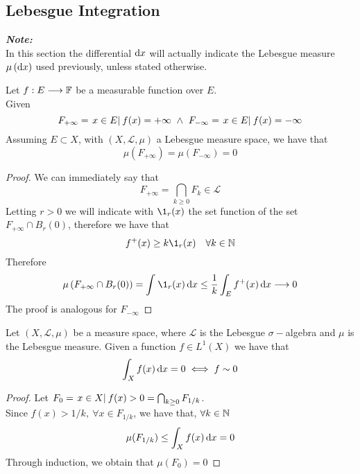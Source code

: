 \documentclass[../complete.tex]{subfiles}
\begin{document}
\subsection{Lebesgue Integration}
\textit{\textbf{Note:}}\\
In this section the differential $\operatorname{d\!} x$ will actually indicate the Lebesgue measure $\mu\left( \operatorname{d\!} x \right)$ used previously, unless stated otherwise.
\begin{thm}
	Let $f:E\overset{}{\longrightarrow}\mathbb{F}$ be a measurable function over $E$.\\
	Given
	\begin{equation*}
		F_{+\infty}={\left.x\in E\right|_{}f(x)=+\infty}\ \wedge\ F_{-\infty}={\left.x\in E\right|_{}f(x)=-\infty}
	\end{equation*}
	Assuming $E\subset X$, with $(X,\mathcal{L},\mu)$ a Lebesgue measure space, we have that
	\begin{equation*}
		\mu\left( F_{+\infty} \right)=\mu\left( F_{-\infty} \right)=0
	\end{equation*}
\end{thm}
\begin{proof}
	We can immediately say that
	\begin{equation*}
		F_{+\infty}=\bigcap_{k\ge0}F_k\in\mathcal{L}
	\end{equation*}
	Letting $r>0$ we will indicate with $\1_r(x)$ the set function of the set $F_{+\infty}\cap B_r(0)$, therefore we have that
	\begin{equation*}
		f^+(x)\ge k\1_r(x)\quad\forall k\in\N
	\end{equation*}
	Therefore
	\begin{equation*}
		\mu\left( F_{+\infty}\cap B_r(0) \right)=\int_{}^{}\1_r(x)\diff x\le\frac{1}{k}\int_{E}f^+(x)\diff x\fto0
	\end{equation*}
	The proof is analogous for $F_{-\infty}$
\end{proof}
\begin{thm}
	Let $(X,\mathcal{L},\mu)$ be a measure space, where $\mathcal{L}$ is the Lebesgue $\sigma-$algebra and $\mu$ is the Lebesgue measure. Given a function $f\in L^1(X)$ we have that
	\begin{equation}
		\int_{X}f(x)\operatorname{d\!} x=0\iff f\sim 0
		\label{eq:nullintegral}
	\end{equation}
\end{thm}
\begin{proof}
	Let $F_0={\left.x\in X\right|_{}f(x)>0}=\bigcap_{k\ge0}F_{1/k}$.\\
	Since $f(x)>1/k,\ \forall x\in F_{1/k}$, we have that, $\forall k\in\mathbb{N}$
	\begin{equation*}
		\mu(F_{1/k})\le\int_{X}^{}f(x)\operatorname{d\!} x=0
	\end{equation*}
	Through induction, we obtain that $\mu(F_0)=0$
\end{proof}
\end{document}
